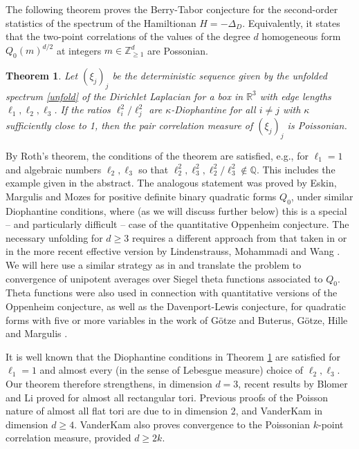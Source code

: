 \documentclass[12pt]{amsart}
\newtheorem{thm}{Theorem}[section]
\theoremstyle{definition}
\theoremstyle{remark}
\numberwithin{equation}{section}
\newcommand{\R}{\mathbb{R}}
\newcommand{\Z}{\mathbb{Z}}
\newcommand{\Q}{\mathbb{Q}}
\begin{document}
The following theorem proves the Berry-Tabor conjecture for the second-order statistics of the spectrum of the Hamiltionan $H=-\Delta_D$. Equivalently, it states that the two-point correlations of the values of the degree $d$ homogeneous form $Q_0(m)^{d/2}$ at integers $m\in\Z_{\geq 1}^d$ are Possonian. 

\begin{thm}
  \label{thm:main}
  Let $(\xi_j)_j$ be the deterministic sequence given by the unfolded spectrum \eqref{unfold} of the Dirichlet Laplacian for a box in $\R^3$ with edge lengths $\ell_1,\ell_2,\ell_3$.
  If the ratios $\ell_i^2/\ell_j^2$ are $\kappa$-Diophantine for all $i \neq j$ with $\kappa$ sufficiently close to 1, then the pair correlation measure of $(\xi_j)_j$ is Poissonian.
 \end{thm}

 By Roth's theorem, the conditions of the theorem are satisfied, e.g., for $\ell_1= 1$ and algebraic numbers $\ell_2,\ell_3$ so that $\ell_2^2,\ell_3^2,\ell_2^2/\ell_3^2\notin\Q$. This includes the example given in the abstract. The analogous statement was proved by Eskin, Margulis and Mozes \cite{EskinMargulisMozes2005} for positive definite binary quadratic forms $Q_0$, under similar Diophantine conditions, where (as we will discuss further below) this is a special -- and particularly difficult -- case of the quantitative Oppenheim conjecture.
 The necessary unfolding for $d \geq 3$ requires a different approach from that taken in \cite{EskinMargulisMozes2005} or in the more recent effective version by Lindenstrauss, Mohammadi and Wang \cite{LMW2023b}.
 We will here use a similar strategy as in \cite{Marklof2002,Marklof2003} and translate the problem to convergence of unipotent averages over Siegel theta functions associated to $Q_0$. 
Theta functions were also used in connection with quantitative versions of the Oppenheim conjecture, as well as the Davenport-Lewis conjecture, for quadratic forms with five or more variables in the work of G\"otze \cite{Goetze2004} and Buterus, G\"otze, Hille and Margulis \cite{BGHM2022}. 

It is well known that the Diophantine conditions in Theorem \ref{thm:main} are satisfied for $\ell_1=1$ and almost every (in the sense of Lebesgue measure) choice of $\ell_2,\ell_3$. Our theorem therefore strengthens, in dimension $d=3$, recent results by Blomer and Li \cite{BlomerLi2023} proved for almost all rectangular tori.
Previous proofs of the Poisson nature of almost all flat tori are due to \cite{Sarnak1997} in dimension 2, and VanderKam \cite{VanderKam1999a,VanderKam1999b,VanderKam2000} in dimension $d\geq 4$. VanderKam \cite{VanderKam2000} also proves convergence to the Poissonian $k$-point correlation measure, provided $d\geq 2k$. 
\end{document}
